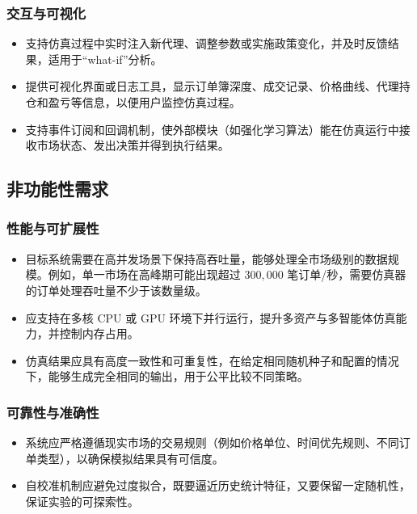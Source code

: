 \subsubsection{交互与可视化}

\begin{itemize}
  \item 支持仿真过程中实时注入新代理、调整参数或实施政策变化，并及时反馈结果，适用于“what-if”分析。
  \item 提供可视化界面或日志工具，显示订单簿深度、成交记录、价格曲线、代理持仓和盈亏等信息，以便用户监控仿真过程。
  \item 支持事件订阅和回调机制，使外部模块（如强化学习算法）能在仿真运行中接收市场状态、发出决策并得到执行结果。
\end{itemize}

\subsection{非功能性需求}

\subsubsection{性能与可扩展性}

\begin{itemize}
  \item 目标系统需要在高并发场景下保持高吞吐量，能够处理全市场级别的数据规模。例如，单一市场在高峰期可能出现超过 $300{,}000$ 笔订单/秒，需要仿真器的订单处理吞吐量不少于该数量级。
  \item 应支持在多核 CPU 或 GPU 环境下并行运行，提升多资产与多智能体仿真能力，并控制内存占用。
  \item 仿真结果应具有高度一致性和可重复性，在给定相同随机种子和配置的情况下，能够生成完全相同的输出，用于公平比较不同策略。
\end{itemize}

\subsubsection{可靠性与准确性}

\begin{itemize}
  \item 系统应严格遵循现实市场的交易规则（例如价格单位、时间优先规则、不同订单类型），以确保模拟结果具有可信度。
  \item 自校准机制应避免过度拟合，既要逼近历史统计特征，又要保留一定随机性，保证实验的可探索性。
\end{itemize}

